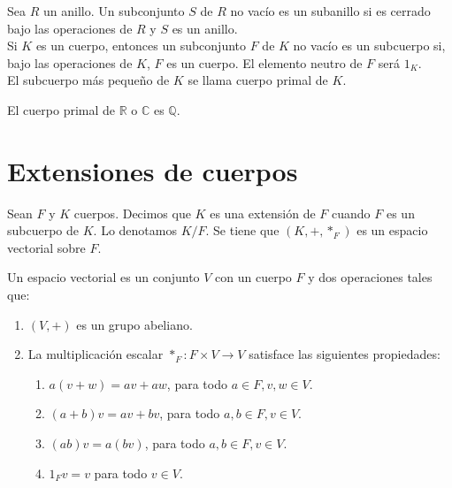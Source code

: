 \begin{definition}
    Sea $R$ un anillo. Un subconjunto $S$ de $R$ no vacío es un subanillo si es cerrado bajo las operaciones de $R$ y $S$ es un anillo.\\
    Si $K$ es un cuerpo, entonces un subconjunto $F$ de $K$ no vacío es un subcuerpo si, bajo las operaciones de $K$, $F$ es un cuerpo. El elemento neutro de $F$ será $1_K$.\\
    El subcuerpo más pequeño de $K$ se llama cuerpo primal de $K$.
\end{definition}

\begin{example}
    El cuerpo primal de $\mathbb{R}$ o $\mathbb{C}$ es $\mathbb{Q}$.
\end{example}

\section{Extensiones de cuerpos}

\begin{definition}
    Sean $F$ y $K$ cuerpos. Decimos que $K$ es una extensión de $F$ cuando $F$ es un subcuerpo de $K$. Lo denotamos $K/F$.
    Se tiene que $(K, +, *_F)$ es un espacio vectorial sobre $F$.
\end{definition}

\begin{definition}
    Un espacio vectorial es un conjunto $V$ con un cuerpo $F$ y dos operaciones tales que:
    \begin{enumerate}
        \item $(V, +)$ es un grupo abeliano.
        \item La multiplicación escalar $*_F : F \times V \to V$ satisface las siguientes propiedades:
              \begin{enumerate}
                  \item $a(v + w) = av + aw$, para todo $a \in F, v, w \in V$.
                  \item $(a + b)v = av + bv$, para todo $a, b \in F, v \in V$.
                  \item $(ab)v = a(bv)$, para todo $a, b \in F, v \in V$.
                  \item $1_Fv = v$ para todo $v \in V$.
              \end{enumerate}
    \end{enumerate}
\end{definition}

